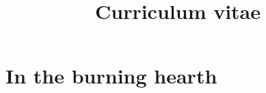 \documentclass[11pt,a4paper,sans]{moderncv}
\title{Curriculum vitae}
\begin{document}
\makecvtitle
\section{In the burning hearth}
\end{document}
